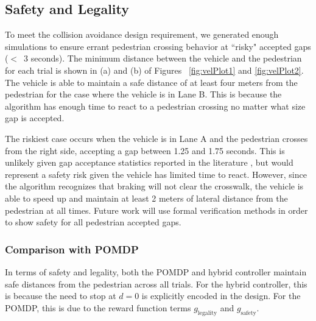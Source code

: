 \documentclass[letterpaper, 10 pt, conference]{ieeeconf} %
\begin{document}
\subsection{Safety and Legality}

To meet the collision avoidance design requirement, we generated enough simulations to ensure errant pedestrian crossing behavior at ``risky" accepted gaps ($<$~3 seconds). The minimum distance between the vehicle and the pedestrian for each trial is shown in (a) and (b) of Figures ~\ref{fig:velPlot1} and \ref{fig:velPlot2}. The vehicle is able to maintain a safe distance of at least four meters from the pedestrian for the case where the vehicle is in Lane B. This is because the algorithm has enough time to react to a pedestrian crossing no matter what size gap is accepted. 

The riskiest case occurs when the vehicle is in Lane A and the pedestrian crosses from the right side, accepting a gap between 1.25 and 1.75 seconds. This is unlikely given gap acceptance statistics reported in the literature \cite{Rasouli}\cite{Feliciani2017}, but would represent a safety risk given the vehicle has limited time to react. However, since the algorithm recognizes that braking will not clear the crosswalk, the vehicle is able to speed up and maintain at least 2 meters of lateral distance from the pedestrian at all times. Future work will use formal verification methods in order to show safety for all pedestrian accepted gaps. 


\subsubsection{Comparison with POMDP}

In terms of safety and legality, both the POMDP and hybrid controller maintain safe distances from the pedestrian across all trials. For the hybrid controller, this is because the need to stop at $d=0$ is explicitly encoded in the design. For the POMDP, this is due to the reward function terms $g_\mathrm{legality}$ and $g_\mathrm{safety}$. 
\end{document}
